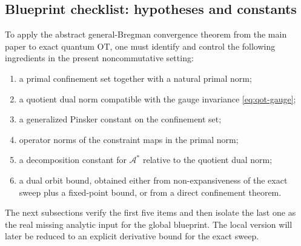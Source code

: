 \documentclass[11pt]{article}
\newcommand{\Aa}{\mathcal{A}}
\theoremstyle{plain}
\begin{document}
\subsection{Blueprint checklist: hypotheses and constants}

To apply the abstract general-Bregman convergence theorem from the main paper to exact quantum OT, one must identify and control the following ingredients in the present noncommutative setting:
\begin{enumerate}[label=\textnormal{(B\arabic*)}]
\item a primal confinement set together with a natural primal norm;
\item a quotient dual norm compatible with the gauge invariance \eqref{eq:qot-gauge};
\item a generalized Pinsker constant on the confinement set;
\item operator norms of the constraint maps in the primal norm;
\item a decomposition constant for $\Aa^\ast$ relative to the quotient dual norm;
\item a dual orbit bound, obtained either from non-expansiveness of the exact sweep plus a fixed-point bound, or from a direct confinement theorem.
\end{enumerate}
The next subsections verify the first five items and then isolate the last one as the real missing analytic input for the global blueprint. The local version will later be reduced to an explicit derivative bound for the exact sweep.
\end{document}
